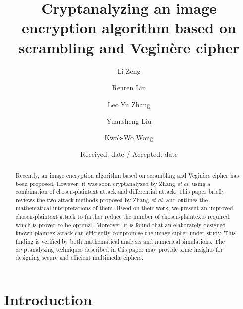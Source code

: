 \documentclass[smallextended, final]{svjour3}          \smartqed
\begin{document}
\title{Cryptanalyzing an image {encryption} algorithm based on {scrambling} and Vegin{\`e}re cipher}

\author{Li Zeng         \and
        Renren Liu      \and
        Leo Yu Zhang    \and
        Yuansheng Liu   \and
        Kwok-Wo Wong
}


\date{Received: date / Accepted: date}


\maketitle

\begin{abstract}
Recently, an image encryption algorithm based on scrambling and Vegin{\`e}re cipher has been proposed.
However, it was soon cryptanalyzed by Zhang \textit{et al.} using a combination of chosen-plaintext attack and differential attack.
This paper briefly reviews the two attack methods proposed by Zhang \textit{et al.} and outlines the mathematical interpretations of them.
Based on their work, we present an improved chosen-plaintext attack to further reduce the number of chosen-plaintexts required, which is proved to be optimal.
Moreover, it is found that an elaborately designed known-plaintex attack can efficiently compromise the image cipher under study.
This finding is verified by both mathematical analysis and numerical simulations. The cryptanalyzing techniques described in this paper may
provide some insights for designing secure and efficient multimedia ciphers.

\end{abstract}

\section{Introduction}
\label{sec:intro}
\end{document}
